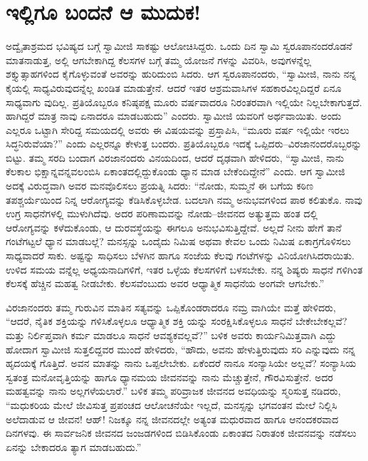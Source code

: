 
\chapter{ಇಲ್ಲಿಗೂ ಬಂದನೆ ಆ ಮುದುಕ!}

\noindent

ಅದ್ವೈತಾಶ್ರಮದ ಭವಿಷ್ಯದ ಬಗ್ಗೆ ಸ್ವಾಮೀಜಿ ಸಾಕಷ್ಟು ಆಲೋಚಿಸಿದ್ದರು. ಒಂದು ದಿನ ಸ್ವಾಮಿ ಸ್ವರೂಪಾನಂದರೊಡನೆ ಮಾತನಾಡುತ್ತ, ಅಲ್ಲಿ ಆಗಬೇಕಾಗಿದ್ದ ಕೆಲಸಗಳ ಬಗ್ಗೆ ತಮ್ಮ ಯೋಜನೆ ಗಳನ್ನು ವಿವರಿಸಿ, ಅವುಗಳನ್ನೆಲ್ಲ ಶಕ್ತ್ಯುತ್ಸಾಹಗಳಿಂದ ಕೈಗೊಳ್ಳುವಂತೆ ಅವರನ್ನು ಹುರಿದುಂಬಿ ಸಿದರು. ಆಗ ಸ್ವರೂಪಾನಂದರು, “ಸ್ವಾಮೀಜಿ, ನಾನು ನನ್ನ ಕೈಯಲ್ಲಿ ಸಾಧ್ಯವಿರುವುದನ್ನೆಲ್ಲ ಖಂಡಿತ ಮಾಡುತ್ತೇನೆ. ಆದರೆ ಇತರ ಆಶ್ರಮವಾಸಿಗಳ ಸಹಕಾರವಿಲ್ಲದಿದ್ದರೆ ಏನೂ ಸಾಧ್ಯವಾಗು ವುದಿಲ್ಲ. ಪ್ರತಿಯೊಬ್ಬರೂ ಕನಿಷ್ಠಪಕ್ಷ ಮೂರು ವರ್ಷವಾದರೂ ನಿರಂತರವಾಗಿ ಇಲ್ಲಿಯೇ ನಿಲ್ಲಬೇಕಾಗುತ್ತದೆ. ಹಾಗಿದ್ದರೆ ಮಾತ್ರ ನಾವು ಏನಾದರೂ ಮಾಡಬಹುದು” ಎಂದರು. ಸ್ವಾಮೀಜಿ ಯವರಿಗೆ ಅರ್ಥವಾಯಿತು. ಅಂದು ಎಲ್ಲರೂ ಒಟ್ಟಾಗಿ ಸೇರಿದ್ದ ಸಮಯದಲ್ಲಿ ಅವರು ಈ ವಿಷಯವನ್ನು ಪ್ರಸ್ತಾಪಿಸಿ, “ಮೂರು ವರ್ಷ ಇಲ್ಲಿಯೇ ಇರಲು ಸಿದ್ಧನಿರುವೆಯಾ?” ಎಂದು ಎಲ್ಲರನ್ನೂ ಕೇಳುತ್ತ ಬಂದರು. ಪ್ರತಿಯೊಬ್ಬರೂ ಇದಕ್ಕೆ ಒಪ್ಪಿದರು–ವಿರಜಾನಂದರೊಬ್ಬರನ್ನು ಬಿಟ್ಟು. ತಮ್ಮ ಸರದಿ ಬಂದಾಗ ವಿರಜಾನಂದರು ವಿನಯದಿಂದ, ಆದರೆ ದೃಢವಾಗಿ ಹೇಳಿದರು, “ಸ್ವಾಮೀಜಿ, ನಾನು ಕೆಲಕಾಲ ಭಿಕ್ಷಾನ್ನವನ್ನವಲಂಬಿಸಿ ಏಕಾಂತದಲ್ಲಿದ್ದುಕೊಂಡು ಧ್ಯಾನ ಮಾಡ ಬೇಕೆಂದಿದ್ದೇನೆ” ಎಂದು. ಆಗ ಸ್ವಾಮೀಜಿ ಅದಕ್ಕೆ ವಿರುದ್ಧವಾಗಿ ಅವರ ಮನವೊಲಿಸಲು ಪ್ರಯತ್ನಿ ಸಿದರು: “ನೋಡು, ಸುಮ್ಮನೆ ಈ ಬಗೆಯ ಕಠಿಣ ತಪಶ್ಚರ್ಯೆಯಿಂದ ನಿನ್ನ ಆರೋಗ್ಯವನ್ನು ಕೆಡಿಸಿಕೊಳ್ಳಬೇಡ. ಬದಲಾಗಿ ನಮ್ಮ ಅನುಭವಗಳಿಂದ ಪಾಠ ಕಲಿತುಕೊ. ನಾವು ಉಗ್ರ ಸಾಧನೆಗಳಲ್ಲಿ ಮುಳುಗಿದೆವು. ಅದರ ಪರಿಣಾಮವನ್ನು ನೋಡು–ಜೀವನದ ಅತ್ಯುತ್ತಮ ಹಂತ ದಲ್ಲಿ ಆರೋಗ್ಯವನ್ನು ಕಳೆದುಕೊಂಡು, ಆ ದುರವಸ್ಥೆಯನ್ನು ಈಗಲೂ ಅನುಭವಿಸುತ್ತಿದ್ದೇವೆ. ಅಲ್ಲದೆ ನೀನು ಹೇಗೆ ತಾನೆ ಗಂಟೆಗಟ್ಟಲೆ ಧ್ಯಾನ ಮಾಡಬಲ್ಲೆ? ಮನಸ್ಸನ್ನು ಒಂದೈದು ನಿಮಿಷ ಅಥವಾ ಕೇವಲ ಒಂದು ನಿಮಿಷ ಏಕಾಗ್ರಗೊಳಿಸಲು ಸಾಧ್ಯವಾದರೆ ಸಾಕು. ಅಷ್ಟನ್ನು ಸಾಧಿಸಲು ಬೆಳಗಿನ ಹಾಗೂ ಸಂಜೆಯ ಕೆಲವು ಗಂಟೆಗಳನ್ನು ವಿನಿಯೋಗಿಸಿದರಾಯಿತು. ಉಳಿದ ಸಮಯ ವನ್ನೆಲ್ಲ ಅಧ್ಯಯನಾದಿಗಳಿಗೆ, ಇತರ ಒಳ್ಳೆಯ ಕೆಲಸಗಳಿಗೆ ಬಳಸಬೇಕು. ನನ್ನ ಶಿಷ್ಯರು ಸಾಧನೆ ಗಳಿಗಿಂತ ಕೆಲಸಕ್ಕೆ ಹೆಚ್ಚಿನ ಮಹತ್ವ ನೀಡಬೇಕು. ಕೆಲಸವೆಂಬುದು ಅವರ ಆಧ್ಯಾತ್ಮಿಕ ಸಾಧನೆಯ ಅಂಗವೇ ಆಗಬೇಕು.”

ವಿರಜಾನಂದರು ತಮ್ಮ ಗುರುವಿನ ಮಾತಿನ ಸತ್ಯವನ್ನು ಒಪ್ಪಿಕೊಂಡರಾದರೂ ನಮ್ರ ವಾಗಿಯೇ ಮತ್ತೆ ಹೇಳಿದರು, “ಆದರೆ, ನೈತಿಕ ಶಕ್ತಿಯನ್ನು ಗಳಿಸಿಕೊಳ್ಳಲೂ ಆಧ್ಯಾತ್ಮಿಕ ಶಕ್ತಿ ಯನ್ನು ಸಂರಕ್ಷಿಸಿಕೊಳ್ಳಲೂ ಸಾಧನೆ ಬೇಕೇಬೇಕಲ್ಲವೆ? ಮತ್ತು ನಿರ್ಲಿಪ್ತವಾಗಿ ಕರ್ಮ ಮಾಡಲೂ ಸಾಧನೆ ಆವಶ್ಯಕವಲ್ಲವೆ?” ಬಳಿಕ ಅವರು ಕಾರ್ಯನಿಮಿತ್ತವಾಗಿ ಎದ್ದು ಹೋದಾಗ ಸ್ವಾಮೀಜಿ ಸುತ್ತಲಿದ್ದವರ ಮುಂದೆ ಹೇಳಿದರು, “ಹೌದು, ಅವನು ಹೇಳುತ್ತಿರುವುದು ಸರಿ ಎನ್ನುವುದು ನನ್ನ ಹೃದಯಕ್ಕೆ ಗೊತ್ತಿದೆ. ಅವನ ಮಾತನ್ನು ನಾನು ಒಪ್ಪಲೇಬೇಕು. ಏಕೆಂದರೆ ನಾನೂ ಸಂನ್ಯಾಸಿಯೇ ಅಲ್ಲವೆ? ಸಂನ್ಯಾಸಿಯ ಸ್ವತಂತ್ರ ಮನೋವೃತ್ತಿಯನ್ನು ಹಾಗೂ ಧ್ಯಾನಮಯ ಜೀವನವನ್ನು ನಾನು ಮೆಚ್ಚುತ್ತೇನೆ, ಗೌರವಿಸುತ್ತೇನೆ. ಅದರ ಮಹತ್ವವನ್ನು ನಾನು ಅಲ್ಲಗಳೆಯಲಾರೆ.” ಬಳಿಕ ತಮ್ಮ ಪರಿವ್ರಾಜಕ ಜೀವನದ ಅವಧಿಯನ್ನು ಸ್ಮರಿಸುತ್ತ ನಡಿದರು, “ಮಧುಕರಿಯ ಮೇಲೆ ಜೀವಿಸುತ್ತ ಪ್ರಪಂಚದ ಆಲೋಚನೆಯೇ ಇಲ್ಲದೆ, ಮನಸ್ಸನ್ನು ಭಗವಂತನ ಮೇಲೆ ನಿಲ್ಲಿಸಿ ಅಲೆದಾಡುವ ಆ ಜೀವನ! ಆಹ್! ನಿಜಕ್ಕೂ ನನ್ನ ಜೀವನದಲ್ಲೇ ಅತ್ಯಂತ ಮಧುರವಾದ ಹಾಗೂ ಆನಂದಕರವಾದ ದಿನಗಳವು. ಈ ಸಾರ್ವಜನಿಕ ಜೀವನದ ಜಂಜಡಗಳಿಂದ ಬಿಡಿಸಿಕೊಂಡು ಏಕಾಂತದ ನಿರಾತಂಕ ಜೀವನವನ್ನು ನಡೆಸಲು ಏನನ್ನು ಬೇಕಾದರೂ ತ್ಯಾಗ ಮಾಡಬಹುದು.”

